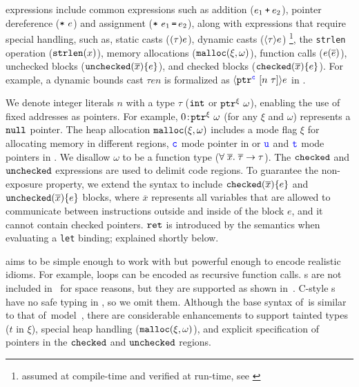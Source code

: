 \systemname expressions include common expressions such as addition ($e_1 \mathbin{\texttt{+}} e_2$), 
pointer dereference ($\texttt{*}~{e}$) and assignment ($\texttt{*}~{e_1}\,\texttt{=}\, {e_2}$),
along with expressions that require special handling, such as,
 static casts ($\mathtt{(}{\tau}\mathtt{)}{e}$), dynamic casts ($\langle{\tau}\rangle{e}$) \footnote{assumed at compile-time and verified at run-time, see \cite{li22checkedc}}, the \texttt{strlen} operation ($\mathtt{strlen}({x})$),
memory allocations ($\mathtt{malloc}({\xi},{\omega})$), 
function calls (${e}({\overline{e}})$),
unchecked blocks ($\mathtt{unchecked}({\overline{x}})\{e\}$), and checked blocks ($\mathtt{checked}({\overline{x}}){\{e\}}$).
For example, a dynamic bounds cast
  { $\tau$\code{>>(}$e$$n$\code{))} }
is formalized as 
{$\langle{\ensuremath{\mathtt{ptr}^{\textcolor{blue}{\texttt{c}}}~{[{n}~{\tau}]}}}\rangle{e}$} in \systemname. 
% 

% 
We denote integer literals $n$ with a type $\tau$ (\ie $\mathtt{int}$ or $\mathtt{ptr}^{\xi}~{\omega}$), enabling the use of fixed addresses as pointers.
For example, ${0}\!:\!{\mathtt{ptr}^{\xi}~{\omega}}$ (for any $\xi$ and $\omega$) represents a $\mathtt{null}$ pointer.
The heap allocation $\mathtt{malloc}({\xi},{\omega})$ includes a mode flag $\xi$ for allocating memory in different regions, $\textcolor{blue}{\texttt{c}}$ mode pointer in \cregion or $\textcolor{blue}{\texttt{u}}$ and $\textcolor{blue}{\texttt{t}}$ mode pointers in \ucregion.
We disallow $\omega$ to be a function type ($\forall \;\overline{x}.\;{\overline{\tau}}\to\tau$).
The $\mathtt{checked}$ and $\mathtt{unchecked}$ expressions are used to delimit code regions.
To guarantee the non-exposure property, we extend the \checkedc syntax to include $\mathtt{checked}({\overline{x}}){\{e\}}$ and $\mathtt{unchecked}({\overline{x}})\{e\}$ blocks,
where $\overline{x}$ represents all variables that are allowed to communicate between instructions outside and inside of the block $e$, and it cannot contain checked pointers.
$\mathtt{ret}$ is introduced by the semantics when evaluating a \texttt{let} binding; explained shortly below.

% 
\systemname{} aims to be simple enough to work with but powerful enough to
encode realistic \systemname idioms. For example,
loops can be encoded as recursive function calls. s are
not included in~ for space reasons, but they are
supported as shown in~\cite{li22checkedc}.
C-style s have no safe typing in \checkedc, so we omit them.
Although the base syntax of~\systemname is similar to that of~\checkedc model~\cite{li22checkedc}, there are considerable enhancements to support tainted types ($t$ in $\xi$), special heap handling (\ie $\mathtt{malloc}({\xi},{\omega})$), and explicit specification of pointers in the $\mathtt{checked}$ and $\mathtt{unchecked}$ regions.

